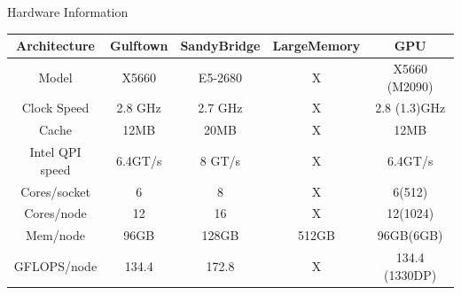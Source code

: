 \documentclass[final,t]{beamer}
\begin{document}
\begin{frame}[fragile]{}
\begin{columns}[t]
\begin{column}{.32\linewidth}
      \begin{block}{Hardware Information}
        \vspace*{-2ex}
      \begin{center}
      \begin{tabular}{|c|c|c|c|c|}
      \hline 
      \textbf{Architecture} & \textbf{Gulftown} & \textbf{SandyBridge} & \textbf{LargeMemory} & \textbf{GPU} \\ 
      \hline 
      Model & X5660 & E5-2680 & X & X5660 (M2090) \\ 
      \hline 
      Clock Speed & 2.8 GHz & 2.7 GHz & X & 2.8 (1.3)GHz\\ 
      \hline 
      Cache & 12MB & 20MB & X & 12MB\\ 
      \hline 
      Intel QPI speed & 6.4GT/s & 8 GT/s & X & 6.4GT/s\\ 
      \hline 
      Cores/socket & 6 & 8 & X & 6(512)\\ 
      \hline       
      Cores/node & 12 & 16 & X & 12(1024)\\ 
      \hline 
      Mem/node & 96GB & 128GB & 512GB & 96GB(6GB)\\ 
      \hline 
      GFLOPS/node & 134.4 & 172.8 & X & 134.4 (1330DP)\\ 
      \hline 
      \end{tabular} 
      \end{center}
        \vspace*{-2ex}
      \end{block}



\end{column}
\end{columns}
\end{frame}
\end{document}
